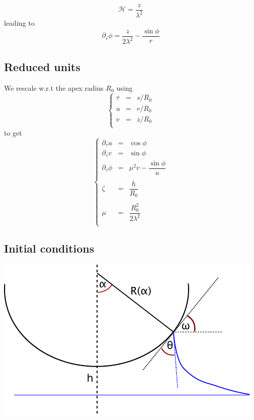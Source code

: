 \documentclass[aps,onecolumn]{revtex4}
\begin{document}
\begin{equation}
	\mathcal{H} = \dfrac{z}{\lambda^2}
\end{equation}
leading to
\begin{equation}
	\partial_s \phi = \dfrac{z}{2\lambda^2} - \dfrac{\sin\phi}{r}
\end{equation}

\subsection{Reduced units}
We rescale w.r.t the apex radius $R_0$ using
\begin{equation}
	\left\lbrace
	\begin{array}{rcl}
		\tau & = & s/R_0 \\
		 u   & = & r/R_0 \\
		 v   & = & z/R_0 \\
	\end{array}
	\right.
\end{equation}
to get
\begin{equation}
	\left\lbrace
	\begin{array}{rcl}
	\partial_\tau u & = & \cos\phi\\
	\partial_\tau v & = & \sin\phi\\
	\partial_\tau \phi & = &  \mu^2 v - \dfrac{\sin\phi}{u}\\
	\\
	\zeta              & = & \dfrac{h}{R_0}\\
	\\
	\mu                & = & \dfrac{R_0^2}{2\lambda^2}\\
	\end{array}
	\right.
\end{equation}
	
\subsection{Initial conditions}

\begin{center}
\includegraphics{geometry.pdf}
\end{center}
\end{document}

